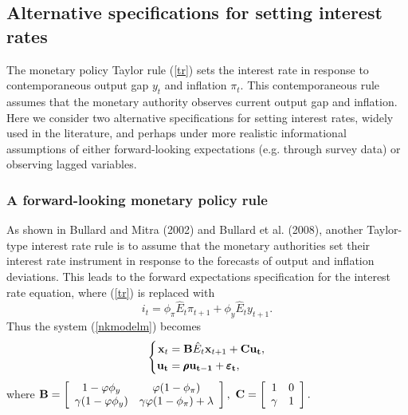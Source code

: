 \subsection{Alternative specifications for setting interest rates}
The monetary policy Taylor rule (\ref{tr}) sets the interest rate in response to contemporaneous output gap $y_t$ and inflation $\pi_t$. This contemporaneous rule assumes that the monetary authority observes current output gap and inflation.  Here we consider two alternative specifications for setting interest rates, widely used in the literature, and perhaps under more realistic informational assumptions of either forward-looking expectations (e.g. through survey data) or observing lagged variables.

\subsubsection{A forward-looking monetary policy rule}
As shown in Bullard and Mitra (2002) and Bullard et al. (2008),
another Taylor-type interest rate rule is to assume that the
monetary authorities set their interest rate instrument in response
to the forecasts of output and inflation deviations. This leads to
the forward expectations specification for the interest rate
equation, where (\ref{tr}) is replaced with
\begin{equation}\label{trexp}
     i_t=\phi_\pi\hat{E}_t\pi_{t+1}+\phi_y \hat{E}_ty_{t+1}.
\end{equation}
Thus the system (\ref{nkmodelm}) becomes
\begin{equation}\label{nkmodelmexp}
    \left\{
    \begin{split}
          {\bf x}_t&={\bf B}\hat{E}_t{\bf x}_{t+1}+{\bf C}\bf{u}_t,\\
          \bf{u}_t&={\pmb\rho}\bf{u}_{t-1}+\pmb{\varepsilon}_t,
    \end{split}
    \right.
\end{equation}
where ${\bf B}=\left[\begin{array}{cc}
1-\varphi\phi_y&\varphi(1-\phi_\pi)\\
\gamma(1-\varphi\phi_y)&\gamma\varphi(1-\phi_\pi)+\lambda
\end{array}\right],\,\,{\bf C}=\left[\begin{array}{cc} 1&0\\
\gamma&1
\end{array}\right].$

